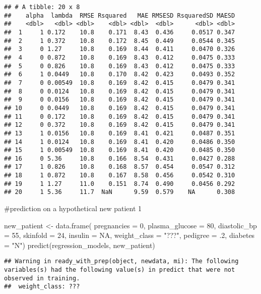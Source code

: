 \documentclass[
]{article}
\newenvironment{Shaded}{\begin{snugshade}}{\end{snugshade}}
\newcommand{\AttributeTok}[1]{\textcolor[rgb]{0.77,0.63,0.00}{#1}}
\newcommand{\ConstantTok}[1]{\textcolor[rgb]{0.00,0.00,0.00}{#1}}
\newcommand{\DecValTok}[1]{\textcolor[rgb]{0.00,0.00,0.81}{#1}}
\newcommand{\FunctionTok}[1]{\textcolor[rgb]{0.00,0.00,0.00}{#1}}
\newcommand{\NormalTok}[1]{#1}
\newcommand{\OtherTok}[1]{\textcolor[rgb]{0.56,0.35,0.01}{#1}}
\newcommand{\StringTok}[1]{\textcolor[rgb]{0.31,0.60,0.02}{#1}}
\begin{document}
\begin{verbatim}
## # A tibble: 20 x 8
##    alpha  lambda  RMSE Rsquared   MAE RMSESD RsquaredSD MAESD
##    <dbl>   <dbl> <dbl>    <dbl> <dbl>  <dbl>      <dbl> <dbl>
##  1     1 0.172    10.8    0.171  8.43  0.436     0.0517 0.347
##  2     1 0.372    10.8    0.172  8.45  0.449     0.0544 0.345
##  3     0 1.27     10.8    0.169  8.44  0.411     0.0470 0.326
##  4     0 0.872    10.8    0.169  8.43  0.412     0.0475 0.333
##  5     0 0.826    10.8    0.169  8.43  0.412     0.0475 0.333
##  6     1 0.0449   10.8    0.170  8.42  0.423     0.0493 0.352
##  7     0 0.00549  10.8    0.169  8.42  0.415     0.0479 0.341
##  8     0 0.0124   10.8    0.169  8.42  0.415     0.0479 0.341
##  9     0 0.0156   10.8    0.169  8.42  0.415     0.0479 0.341
## 10     0 0.0449   10.8    0.169  8.42  0.415     0.0479 0.341
## 11     0 0.172    10.8    0.169  8.42  0.415     0.0479 0.341
## 12     0 0.372    10.8    0.169  8.42  0.415     0.0479 0.341
## 13     1 0.0156   10.8    0.169  8.41  0.421     0.0487 0.351
## 14     1 0.0124   10.8    0.169  8.41  0.420     0.0486 0.350
## 15     1 0.00549  10.8    0.169  8.41  0.420     0.0485 0.350
## 16     0 5.36     10.8    0.166  8.54  0.431     0.0427 0.288
## 17     1 0.826    10.8    0.168  8.57  0.454     0.0547 0.312
## 18     1 0.872    10.8    0.167  8.58  0.456     0.0542 0.310
## 19     1 1.27     11.0    0.151  8.74  0.490     0.0456 0.292
## 20     1 5.36     11.7  NaN      9.59  0.579    NA      0.308
\end{verbatim}

\#prediction on a hypothetical new patient 1

\begin{Shaded}
\begin{Highlighting}[]
\NormalTok{new\_patient }\OtherTok{\textless{}{-}} \FunctionTok{data.frame}\NormalTok{(}
  \AttributeTok{pregnancies =} \DecValTok{0}\NormalTok{,}
  \AttributeTok{plasma\_glucose =} \DecValTok{80}\NormalTok{,}
  \AttributeTok{diastolic\_bp =} \DecValTok{55}\NormalTok{,}
  \AttributeTok{skinfold =} \DecValTok{24}\NormalTok{,}
  \AttributeTok{insulin =} \ConstantTok{NA}\NormalTok{,}
  \AttributeTok{weight\_class =} \StringTok{"???"}\NormalTok{,}
  \AttributeTok{pedigree =}\NormalTok{ .}\DecValTok{2}\NormalTok{,}
  \AttributeTok{diabetes =} \StringTok{"N"}\NormalTok{)}
\FunctionTok{predict}\NormalTok{(regression\_models, new\_patient)}
\end{Highlighting}
\end{Shaded}

\begin{verbatim}
## Warning in ready_with_prep(object, newdata, mi): The following variables(s) had the following value(s) in predict that were not observed in training. 
##  weight_class: ???
\end{verbatim}
\end{document}
